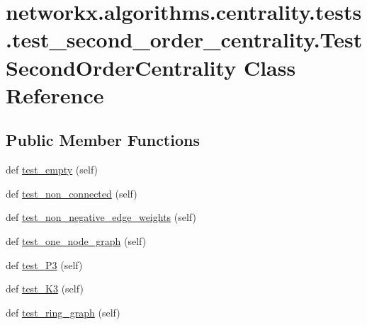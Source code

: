 \hypertarget{classnetworkx_1_1algorithms_1_1centrality_1_1tests_1_1test__second__order__centrality_1_1TestSecondOrderCentrality}{}\section{networkx.\+algorithms.\+centrality.\+tests.\+test\+\_\+second\+\_\+order\+\_\+centrality.\+Test\+Second\+Order\+Centrality Class Reference}
\label{classnetworkx_1_1algorithms_1_1centrality_1_1tests_1_1test__second__order__centrality_1_1TestSecondOrderCentrality}
\subsection*{Public Member Functions}
\begin{DoxyCompactItemize}
\item 
def \hyperlink{classnetworkx_1_1algorithms_1_1centrality_1_1tests_1_1test__second__order__centrality_1_1TestSecondOrderCentrality_aeae0d4c4df0d09b8b253c30b3937cf31}{test\+\_\+empty} (self)
\item 
def \hyperlink{classnetworkx_1_1algorithms_1_1centrality_1_1tests_1_1test__second__order__centrality_1_1TestSecondOrderCentrality_ae29640098bcac07349071a92b2200ff8}{test\+\_\+non\+\_\+connected} (self)
\item 
def \hyperlink{classnetworkx_1_1algorithms_1_1centrality_1_1tests_1_1test__second__order__centrality_1_1TestSecondOrderCentrality_a87c6a63ba37b25580109ca813f1ebd31}{test\+\_\+non\+\_\+negative\+\_\+edge\+\_\+weights} (self)
\item 
def \hyperlink{classnetworkx_1_1algorithms_1_1centrality_1_1tests_1_1test__second__order__centrality_1_1TestSecondOrderCentrality_a56d6774bff05def69489719b38be21ac}{test\+\_\+one\+\_\+node\+\_\+graph} (self)
\item 
def \hyperlink{classnetworkx_1_1algorithms_1_1centrality_1_1tests_1_1test__second__order__centrality_1_1TestSecondOrderCentrality_a789e15a53c151d4c24380a555ab02ca4}{test\+\_\+\+P3} (self)
\item 
def \hyperlink{classnetworkx_1_1algorithms_1_1centrality_1_1tests_1_1test__second__order__centrality_1_1TestSecondOrderCentrality_a21e6da37c15bbeec3b70dc10b373556c}{test\+\_\+\+K3} (self)
\item 
def \hyperlink{classnetworkx_1_1algorithms_1_1centrality_1_1tests_1_1test__second__order__centrality_1_1TestSecondOrderCentrality_aa2c32ee9cb5e21764ae19fa49c3d98e1}{test\+\_\+ring\+\_\+graph} (self)
\end{DoxyCompactItemize}


